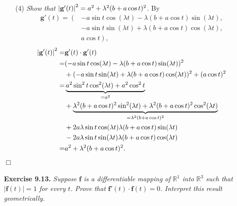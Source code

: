 \documentclass{article}
\begin{document}
\begin{enumerate}
\item[(4)]
  \emph{Show that $\abs{ \mathbf{g}'(t) }^2= a^2 + \lambda^2(b + a \cos t)^2$.}
  By
  \begin{align*}
    \mathbf{g}'(t)
    = \left( \right.
        &-a\sin t \cos(\lambda t)-\lambda(b+a\cos t)\sin(\lambda t), \\
        &-a\sin t \sin(\lambda t)+\lambda(b+a\cos t)\cos(\lambda t), \\
        &a\cos t
      \left. \right),
  \end{align*}
  \begin{align*}
    \abs{ \mathbf{g}'(t) }^2
    =& \mathbf{g}'(t) \cdot \mathbf{g}'(t) \\
    =& (-a\sin t \cos(\lambda t)-\lambda(b+a\cos t)\sin(\lambda t))^2 \\
      &+ (-a\sin t \sin(\lambda t)+\lambda(b+a\cos t)\cos(\lambda t))^2 + (a\cos t)^2 \\
    =& \underbrace{a^2 \sin^2 t \cos^2(\lambda t) + a^2 \cos^2 t}_{= a^2} \\
      &+ \underbrace{\lambda^2(b+a\cos t)^2\sin^2(\lambda t)
        + \lambda^2(b+a\cos t)^2\cos^2(\lambda t)}_{= \lambda^2(b+a\cos t)^2} \\
      &+ 2a\lambda \sin t\cos(\lambda t)\lambda(b+a\cos t)\sin(\lambda t) \\
      &- 2a\lambda \sin t\sin(\lambda t)\lambda(b+a\cos t)\cos(\lambda t) \\
    =& a^2 + \lambda^2(b+a\cos t)^2.
  \end{align*}
\end{enumerate}
$\Box$ \\\\






\textbf{Exercise 9.13.}
\emph{Suppose $\mathbf{f}$ is a differentiable mapping of $\mathbb{R}^1$ into
$\mathbb{R}^3$ such that $|\mathbf{f}(t)| = 1$ for every $t$.
Prove that $\mathbf{f}'(t) \cdot \mathbf{f}(t) = 0$.
Interpret this result geometrically.} \\
\end{document}
